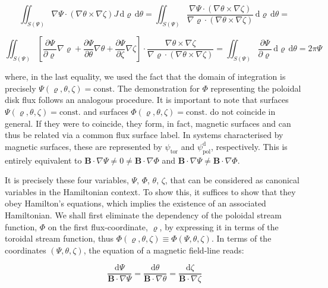 \begin{equation}
    \iint_{S(\Psi)}\nabla\Psi\cdot(\nabla\theta\times\nabla\zeta)J\,\mathrm{d}\varrho\,\mathrm{d}\theta
    =\iint_{S(\Psi)}\frac{\nabla\Psi\cdot(\nabla\theta\times\nabla\zeta)}{\nabla\varrho\cdot(\nabla\theta\times\nabla\zeta)}\,\mathrm{d}\varrho\,\mathrm{d}\theta=
\end{equation}

\begin{equation}
    \iint_{S(\Psi)}\left[\frac{\partial\Psi}{\partial\varrho}\nabla\varrho+\frac{\partial\Psi}{\partial\theta}\nabla\theta+\frac{\partial\Psi}{\partial\zeta}\nabla\zeta\right]\cdot\frac{\nabla\theta\times\nabla\zeta}{\nabla\varrho\cdot(\nabla\theta\times\nabla\zeta)}=\iint_{S(\Psi)}\frac{\partial\Psi}{\partial\varrho}\,\mathrm{d}\varrho\,\mathrm{d}\theta=2\pi\Psi
\end{equation}

where, in the last equality, we used the fact that the domain of integration is precisely $\Psi(\varrho,\theta,\zeta)=\text{const}$. The demonstration for $\Phi$ representing the poloidal disk flux follows an analogous procedure. It is important to note that surfaces $\Psi(\varrho,\theta,\zeta)=\text{const.}$ and surfaces $\Phi(\varrho,\theta,\zeta)=\text{const.}$ do not coincide in general. If they were to coincide, they form, in fact, magnetic surfaces and can thus be related via a common flux surface label. In systems characterised by magnetic surfaces, these are represented by $\psi_\text{tor}$ and $\psi_\text{pol}^\mathrm{d}$, respectively. This is entirely equivalent to $\mathbf{B}\cdot\nabla\Psi\neq0\neq\mathbf{B}\cdot\nabla\Phi$ and $\mathbf{B}\cdot\nabla\Psi\neq\mathbf{B}\cdot\nabla\Phi$.

\quad It is precisely these four variables, $\Psi$, $\Phi$, $\theta$, $\zeta$, that can be considered as canonical variables in the Hamiltonian context. To show this, it suffices to show that they obey Hamilton's equations, which implies the existence of an associated Hamiltonian. We shall first eliminate the dependency of the poloidal stream function, $\Phi$ on the first flux-coordinate, $\varrho$, by expressing it in terms of the toroidal stream function, thus $\Phi(\varrho,\theta,\zeta)\equiv\Phi(\Psi,\theta,\zeta)$. In terms of the coordinates $(\Psi,\theta,\zeta)$, the equation of a magnetic field-line reads:

\begin{equation}
    \frac{\mathrm{d}\Psi}{\mathbf{B}\cdot\nabla\Psi}=\frac{\mathrm{d}\theta}{\mathbf{B}\cdot\nabla\theta}=\frac{\mathrm{d}\zeta}{\mathbf{B}\cdot\nabla\zeta}
\end{equation}

